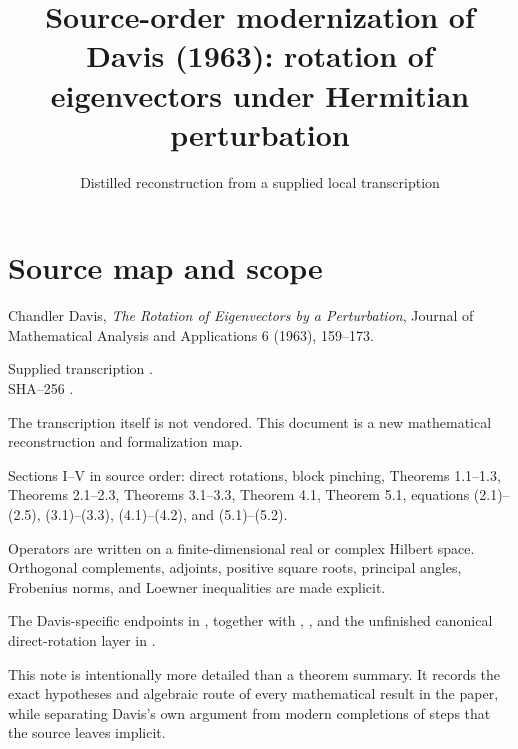 
\title{Source-order modernization of Davis (1963): rotation of eigenvectors under Hermitian perturbation}
\author{}
\date{Distilled reconstruction from a supplied local transcription}

\maketitle

\section*{Source map and scope}
\begin{sourceguide}
\item[Primary source] Chandler Davis, \emph{The Rotation of Eigenvectors by a Perturbation}, Journal of Mathematical Analysis and Applications 6 (1963), 159--173.
\item[Local evidence] Supplied transcription {\small{}}.\\ SHA--256 \texttt{}.
\item[Redistribution] The transcription itself is not vendored. This document is a new mathematical reconstruction and formalization map.
\item[Coverage] Sections I--V in source order: direct rotations, block pinching, Theorems 1.1--1.3, Theorems 2.1--2.3, Theorems 3.1--3.3, Theorem 4.1, Theorem 5.1, equations (2.1)--(2.5), (3.1)--(3.3), (4.1)--(4.2), and (5.1)--(5.2).
\item[Modernization] Operators are written on a finite-dimensional real or complex Hilbert space. Orthogonal complements, adjoints, positive square roots, principal angles, Frobenius norms, and Loewner inequalities are made explicit.
\item[Formalization target] The Davis-specific endpoints in , together with , , and the unfinished canonical direct-rotation layer in .
\end{sourceguide}

This note is intentionally more detailed than a theorem summary. It records the exact hypotheses and algebraic route of every mathematical result in the paper, while separating Davis's own argument from modern completions of steps that the source leaves implicit.

